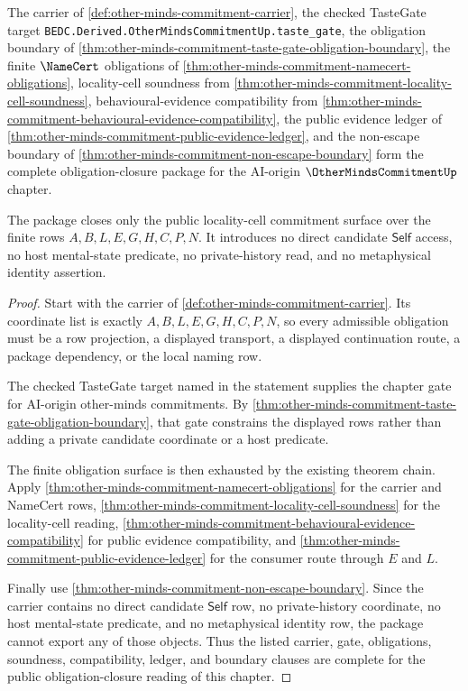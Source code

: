 \begin{theorem}
\label{thm:other-minds-commitment-obligation-closure-package}
The carrier of \autoref{def:other-minds-commitment-carrier}, the checked TasteGate target \texttt{BEDC.Derived.OtherMindsCommitmentUp.taste\_gate}, the obligation boundary of \autoref{thm:other-minds-commitment-taste-gate-obligation-boundary}, the finite $\NameCert$ obligations of \autoref{thm:other-minds-commitment-namecert-obligations}, locality-cell soundness from \autoref{thm:other-minds-commitment-locality-cell-soundness}, behavioural-evidence compatibility from \autoref{thm:other-minds-commitment-behavioural-evidence-compatibility}, the public evidence ledger of \autoref{thm:other-minds-commitment-public-evidence-ledger}, and the non-escape boundary of \autoref{thm:other-minds-commitment-non-escape-boundary} form the complete obligation-closure package for the AI-origin $\OtherMindsCommitmentUp$ chapter.

The package closes only the public locality-cell commitment surface over the finite rows $A,B,L,E,G,H,C,P,N$. It introduces no direct candidate $\mathsf{Self}$ access, no host mental-state predicate, no private-history read, and no metaphysical identity assertion.
\end{theorem}
\begin{proof}
Start with the carrier of \autoref{def:other-minds-commitment-carrier}. Its coordinate list is exactly $A,B,L,E,G,H,C,P,N$, so every admissible obligation must be a row projection, a displayed transport, a displayed continuation route, a package dependency, or the local naming row.

The checked TasteGate target named in the statement supplies the chapter gate for AI-origin other-minds commitments. By \autoref{thm:other-minds-commitment-taste-gate-obligation-boundary}, that gate constrains the displayed rows rather than adding a private candidate coordinate or a host predicate.

The finite obligation surface is then exhausted by the existing theorem chain. Apply \autoref{thm:other-minds-commitment-namecert-obligations} for the carrier and NameCert rows, \autoref{thm:other-minds-commitment-locality-cell-soundness} for the locality-cell reading, \autoref{thm:other-minds-commitment-behavioural-evidence-compatibility} for public evidence compatibility, and \autoref{thm:other-minds-commitment-public-evidence-ledger} for the consumer route through $E$ and $L$.

Finally use \autoref{thm:other-minds-commitment-non-escape-boundary}. Since the carrier contains no direct candidate $\mathsf{Self}$ row, no private-history coordinate, no host mental-state predicate, and no metaphysical identity row, the package cannot export any of those objects. Thus the listed carrier, gate, obligations, soundness, compatibility, ledger, and boundary clauses are complete for the public obligation-closure reading of this chapter.
\end{proof}

